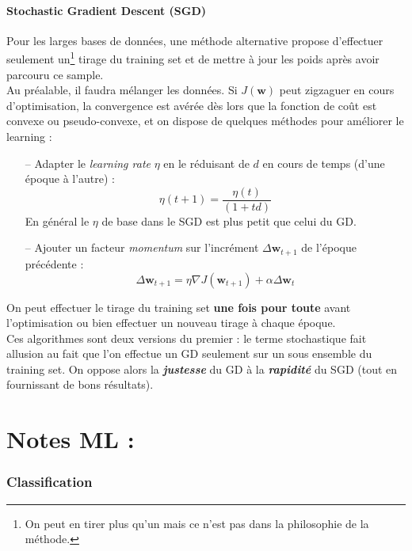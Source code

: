\documentclass[a4paper,12pt]{report}
\newcommand\bk{\color{black}}
\newcommand\brick{\color{brick}}
\newcommand\navy{\color{navy}}
\numberwithin{equation}{section} %
\begin{document}
\subsubsection*{Stochastic Gradient Descent (SGD)}
\noindent Pour les larges bases de données, une méthode alternative propose d'effectuer seulement un\footnote{On peut en tirer plus qu'un mais ce n'est pas dans la philosophie de la méthode.} tirage du training set et de mettre à jour les poids après avoir parcouru ce sample. \\ 
Au préalable, il faudra mélanger les données. 
Si $J(\textbf{w})$ peut zigzaguer en cours d'optimisation, la convergence est avérée dès lors que la fonction de coût est convexe ou pseudo-convexe, et on dispose de quelques méthodes pour améliorer le learning :
\begin{itemize}
\item[--] Adapter le \textit{learning rate} $\eta$ en le réduisant de $d$ en cours de temps (d'une époque à l'autre) : 
\begin{equation}
\eta(t+1) = \frac{\eta(t)}{(1 + td)} \label{lr_decay}
\end{equation}
En général le $\eta$ de base dans le SGD est plus petit que celui du GD.
\item[--] Ajouter un facteur \textit{momentum} sur l'incrément $\Delta \textbf{w}_{t+1}$ de l'époque précédente :
\begin{equation}
\Delta \textbf{w}_{t+1} = \eta \nabla J(\textbf{w}_{t+1}) + \alpha \Delta \textbf{w}_t
\end{equation}
\end{itemize}
\noindent On peut effectuer le tirage du training set \textbf{une fois pour toute} avant l'optimisation ou bien effectuer un nouveau tirage à chaque époque.\\

\noindent Ces algorithmes sont deux versions du premier : le terme stochastique fait allusion au fait que l'on effectue un GD seulement sur un sous ensemble du training set. On oppose alors la \textit{\textbf{justesse}} du GD à la \textit{\textbf{rapidité}} du SGD (tout en fournissant de bons résultats).  


\navy \chapter{Notes ML : \cite{muller2016introduction}} \bk
\brick \subsection{Classification}\bk
\end{document}
